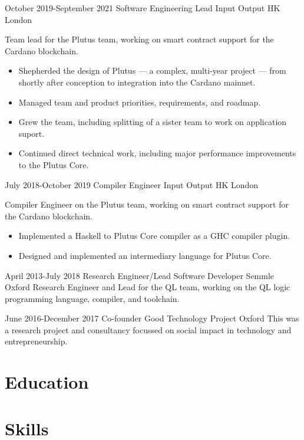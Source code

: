 \documentclass[12pt,a4paper,sans]{moderncv}
\begin{document}
\cventry
{October 2019-September 2021}
{Software Engineering Lead}
{Input Output HK}
{London}
{}
{
  Team lead for the Plutus team, working on smart contract support for the Cardano blockchain.
  \begin{itemize}
    \item Shepherded the design of Plutus --- a  complex, multi-year project --- from shortly after conception to integration into the Cardano mainnet.
    \item Managed team and product priorities, requirements, and roadmap.
    \item Grew the team, including splitting of a sister team to work on application suport.
    \item Continued direct technical work, including major performance improvements to the Plutus Core.
  \end{itemize}
}

\cventry
{July 2018-October 2019}
{Compiler Engineer}
{Input Output HK}
{London}
{}
{
  Compiler Engineer on the Plutus team, working on smart contract support for the Cardano blockchain.
  \begin{itemize}
    \item Implemented a Haskell to Plutus Core compiler as a GHC compiler plugin.
    \item Designed and implemented an intermediary language for Plutus Core.
  \end{itemize}
}

\cventry
{April 2013-July 2018}
{Research Engineer/Lead Software Developer}
{Semmle}
{Oxford}
{}
{
  Research Engineer and Lead for the QL team, working on the QL logic programming language, compiler, and toolchain.
}

\cventry
{June 2016-December 2017}
{Co-founder}
{Good Technology Project}
{Oxford}
{}
{
  This was a research project and consultancy focussed on social impact in technology and entrepreneurship. 
}

\section{Education}

\section{Skills}
\end{document}
